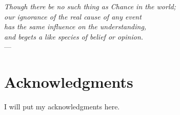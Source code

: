 
\begin{flushright}{\slshape    
Though there be no such thing as Chance in the world; \\
our ignorance of the real cause of any event \\
has the same influence on the understanding, \\
and begets a like species of belief or opinion.} \\ \medskip
    --- 
\end{flushright}



\bigskip

\begingroup
\let\clearpage\relax
\let\cleardoublepage\relax
\let\cleardoublepage\relax
\chapter*{Acknowledgments}
I will put my acknowledgments here.

\endgroup



